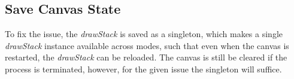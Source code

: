 \subsection{Save Canvas State}
To fix the issue, the \textit{drawStack} is saved as a singleton, which makes a single \textit{drawStack} instance available across modes, such that even when the canvas is restarted, the \textit{drawStack} can be reloaded. 
The canvas is still be cleared if the process is terminated, however, for the given issue the singleton will suffice.